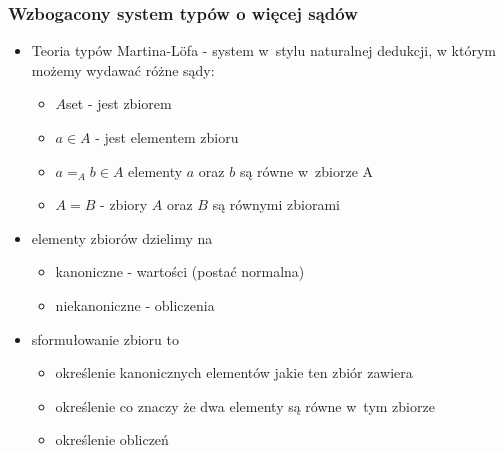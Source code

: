 \documentclass{beamer}
\begin{document}
\begin{frame}
\frametitle{Wzbogacony system typów o więcej sądów}

\begin{itemize}
 \item Teoria typów Martina-L\"{o}fa - system w~stylu naturalnej dedukcji, w którym możemy wydawać różne sądy:
       
\begin{itemize}
 \item $A$\;set -  jest zbiorem
 \item $a \in A$ - jest elementem zbioru
 \item $a =_A b \in A$ elementy $a$ oraz $b$ są równe w~zbiorze A
 \item $A = B$ - zbiory $A$ oraz $B$ są równymi zbiorami
\end{itemize}

\item elementy zbiorów dzielimy na
\begin{itemize}
 \item kanoniczne - wartości (postać normalna)
 \item niekanoniczne - obliczenia 
\end{itemize}


\item sformułowanie zbioru to
\begin{itemize}
 \item określenie kanonicznych elementów jakie ten zbiór zawiera
 \item określenie co znaczy że dwa elementy są równe w~tym zbiorze
 \item określenie obliczeń
\end{itemize}

\end{itemize}

\end{frame}

\end{document}
